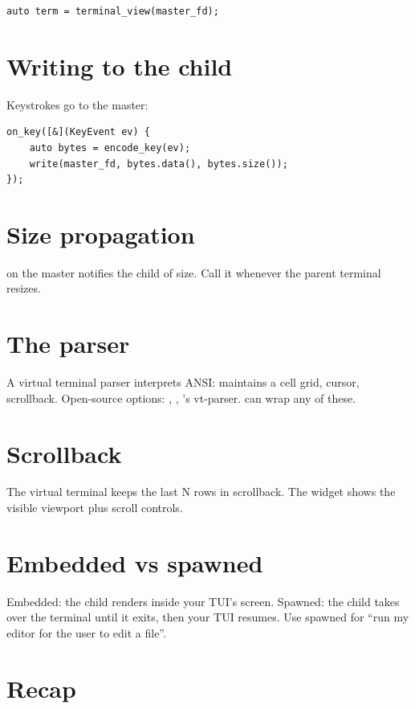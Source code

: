 \begin{lstlisting}
auto term = terminal_view(master_fd);
\end{lstlisting}

\section{Writing to the child}

Keystrokes go to the master:

\begin{lstlisting}
on_key([&](KeyEvent ev) {
    auto bytes = encode_key(ev);
    write(master_fd, bytes.data(), bytes.size());
});
\end{lstlisting}

\section{Size propagation}

 on the master notifies the child of size.
Call it whenever the parent terminal resizes.

\section{The parser}

A virtual terminal parser interprets ANSI: maintains a
cell grid, cursor, scrollback. Open-source options:
, , 's
vt-parser. \maya{} can wrap any of these.

\section{Scrollback}

The virtual terminal keeps the last N rows in scrollback.
The widget shows the visible viewport plus scroll
controls.

\section{Embedded vs spawned}

Embedded: the child renders inside your TUI's screen.
Spawned: the child takes over the terminal until it
exits, then your TUI resumes. Use spawned for ``run my
editor for the user to edit a file''.

\section{Recap}

